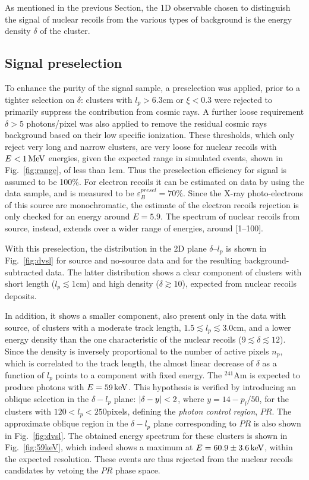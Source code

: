 As mentioned in the previous Section, the 1D observable chosen to
distinguish the signal of nuclear recoils from the various types of
background is the energy density $\delta$ of the cluster.

\subsection{Signal preselection}
To enhance the purity of the signal sample, a preselection was
applied, prior to a tighter selection on $\delta$: clusters with
$l_p>6.3$\unit{cm} or $\xi<0.3$ were rejected to primarily suppress
the contribution from cosmic rays. A further loose requirement
$\delta>5$ photons/pixel was also applied to remove the residual
cosmic rays background based on their low specific ionization. These
thresholds, which only reject very long and narrow clusters, are very
loose for nuclear recoils with $E<1\,\textrm{Me\hspace{-.08em}V}$ energies, given the expected
range in simulated events, shown in Fig.~\ref{fig:range}, of less than
1\unit{cm}. Thus the preselection efficiency for signal is assumed to
be 100\%. For electron recoils it can be estimated on data by using
the \fe data sample, and is measured to be
$\varepsilon_{B}^{presel}=70\%$. Since the X-ray photo-electrons of
this source are monochromatic, the estimate of the electron recoils
rejection is only checked for an energy around $E=5.9$\keV. The
spectrum of nuclear recoils from \ambe source, instead, extends over a
wider range of energies, around [1--100]\keV.

With this preselection, the distribution in the 2D plane
$\delta$--$l_p$ is shown in Fig.~\ref{fig:dvsl} for \ambe source and
no-source data and for the resulting background-subtracted \ambe data.
The latter distribution shows a clear component of clusters with short
length ($l_p\lesssim1$\unit{cm}) and high density ($\delta\gtrsim
10$), expected from nuclear recoils deposits.

In addition, it shows a smaller component, also present only in the
data with \ambe source, of clusters with a moderate track length,
$1.5 \lesssim l_p \lesssim 3.0$\unit{cm}, and a lower energy density
than the one characteristic of the nuclear recoils
($9\lesssim\delta\lesssim12$). Since the density is inversely
proportional to the number of active pixels $n_p$, which is correlated
to the track length, the almost linear decrease of $\delta$ as a
function of $l_p$ points to a component with fixed energy. The
$^{241}$Am is expected to produce photons with $E=59\,\textrm{ke\hspace{-.08em}V}$. This
hypothesis is verified by introducing an oblique selection in the
$\delta-l_p$ plane: $\vert \delta-y \vert<2$, where $y=14-p_l/50$, for the
clusters with $120<l_p<250$\unit{pixels}, defining the \textit{photon
control region}, $PR$. The approximate oblique region in the
$\delta-l_p$ plane corresponding to $PR$ is also shown in
Fig.~\ref{fig:dvsl}.  The obtained energy spectrum for these clusters
is shown in Fig.~\ref{fig:59keV}, which indeed shows a maximum at
$E=60.9\pm3.6\,\textrm{ke\hspace{-.08em}V}$, within the expected resolution. These events are
thus rejected from the nuclear recoils candidates by vetoing the $PR$
phase space.

